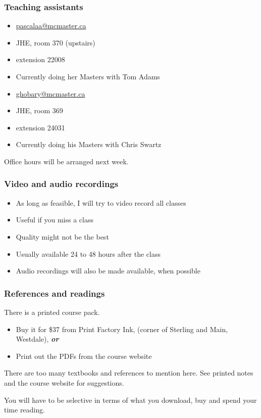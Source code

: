 \begin{frame}\frametitle{Teaching assistants}
	{\color{myGreen}{Alicia Pascall }}
	\begin{itemize}
		\item	\url{pascalaa@mcmaster.ca}
		\item	JHE, room 370 (upstairs)
		\item	extension 22008
		\item	Currently doing her Masters with Tom Adams
	\end{itemize}
	\vspace{12pt}
	{\color{myGreen}{Yasser Ghobara}}
	\begin{itemize}
		\item	\url{ghobary@mcmaster.ca}
		\item	JHE, room 369
		\item	extension 24031
		\item	Currently doing his Masters with Chris Swartz
	\end{itemize}
	\vspace{12pt}
	Office hours will be arranged next week.
\end{frame}

\begin{frame}\frametitle{Video and audio recordings}
	\begin{itemize}
		\item	As long as feasible, I will try to video record all classes
		\item	Useful if you miss a class
		\item	Quality might not be the best
		\item	Usually available 24 to 48 hours after the class
		\item	Audio recordings will also be made available, when possible
	\end{itemize}
\end{frame}

\begin{frame}\frametitle{References and readings}
	
	There is a printed course pack.
	\vspace{12pt}
	\begin{itemize}
		\item	Buy it for \$37 from Print Factory Ink, (corner of Sterling and Main, Westdale), \emph{\textbf{or}}
		\item	Print out the PDFs from the course website
	\end{itemize}
	\vspace{12pt}
	There are too many textbooks and references to mention here. See printed notes and the course website for suggestions.
	
	\vspace{6pt}
	You will have to be selective in terms of what you download, buy and spend your time reading.
\end{frame}

